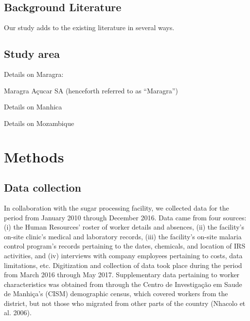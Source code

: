 \documentclass[]{article}
\begin{document}
\subsection{Background Literature}\label{background-literature}


Our study adds to the existing literature in several ways.

\subsection{Study area}\label{study-area}

Details on Maragra:

Maragra Açucar SA (henceforth referred to as
``Maragra'')

Details on Manhica

Details on Mozambique

\section{Methods}\label{methods}

\subsection{Data collection}\label{data-collection}

In collaboration with the sugar processing facility, we collected data
for the period from January 2010 through December 2016. Data came from
four sources: (i) the Human Resources' roster of worker details and
absences, (ii) the facility's on-site clinic's medical and laboratory
records, (iii) the facility's on-site malaria control program's records
pertaining to the dates, chemicals, and location of IRS activities, and
(iv) interviews with company employees pertaining to costs, data
limitations, etc. Digitization and collection of data took place during
the period from March 2016 through May 2017. Supplementary data
pertaining to worker characteristics was obtained from through the
Centro de Investigação em Saude de Manhiça's (CISM) demographic census,
which covered workers from the district, but not those who migrated from
other parts of the country (Nhacolo et al. 2006).
\end{document}
